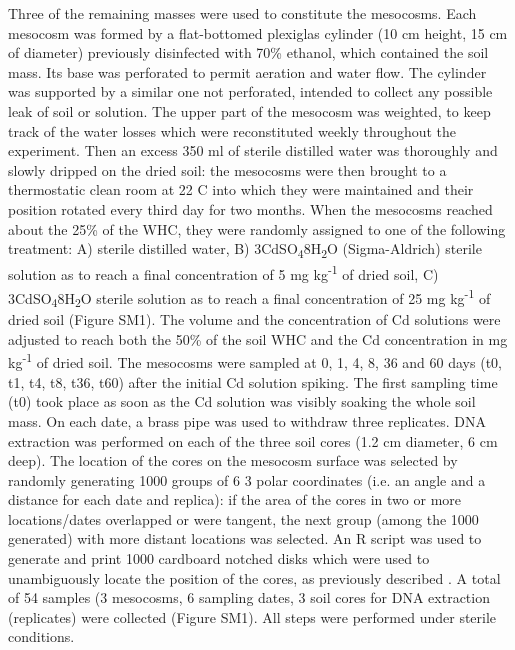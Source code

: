 Three of the remaining masses were used to constitute the mesocosms. Each mesocosm was formed by a flat-bottomed plexiglas cylinder (10 cm height, 15 cm of diameter) previously disinfected with 70\% ethanol, which contained the soil mass. Its base was perforated to permit aeration and water flow. The cylinder was supported by a similar one not perforated, intended to collect any possible leak of soil or solution. The upper part of the mesocosm was weighted, to keep track of the water losses which were reconstituted weekly throughout the experiment. Then an excess 350 ml of sterile distilled water was thoroughly and slowly dripped on the dried soil: the mesocosms were then brought to a thermostatic clean room at 22 {\textdegree}C into which they were maintained and their position rotated every third day for two months. When the mesocosms reached about the 25\% of the WHC, they were randomly assigned to one of the following treatment: A) sterile distilled water, B) 3CdSO\textsubscript{4}{\textperiodcentered}8H\textsubscript{2}O (Sigma-Aldrich) sterile solution as to reach a final concentration of 5 mg kg\textsuperscript{-1} of dried soil, C) 3CdSO\textsubscript{4}{\textperiodcentered}8H\textsubscript{2}O sterile solution as to reach a final concentration of 25 mg kg\textsuperscript{-1} of dried soil (Figure SM1). The volume and the concentration of Cd solutions were adjusted to reach both the 50\% of the soil WHC and the Cd concentration in mg kg\textsuperscript{-1} of dried soil. The mesocosms were sampled at 0, 1, 4, 8, 36 and 60 days (t0, t1, t4, t8, t36, t60) after the initial Cd solution spiking. The first sampling time (t0) took place as soon as the Cd solution was visibly soaking the whole soil mass. On each date, a brass pipe was used to withdraw three replicates. DNA extraction was performed on each of the three soil cores (1.2 cm diameter, 6 cm deep). The location of the cores on the mesocosm surface was selected by randomly generating 1000 groups of 6 {\texttimes} 3 polar coordinates (i.e. an angle and a distance for each date and replica): if the area of the cores in two or more locations/dates overlapped or were tangent, the next group (among the 1000 generated) with more distant locations was selected. An R script was used to generate and print 1000 cardboard notched disks which were used to unambiguously locate the position of the cores, as previously described \cite{ceccherini2007effect}. A total of 54 samples (3 mesocosms, 6 sampling dates, 3 soil cores for DNA extraction (replicates) were collected (Figure SM1). All steps were performed under sterile  conditions.\\


